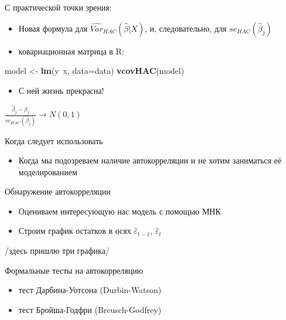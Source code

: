 \documentclass[ignorenonframetext,]{beamer}
\newenvironment{Shaded}{\begin{snugshade}}{\end{snugshade}}
\newcommand{\KeywordTok}[1]{\textcolor[rgb]{0.13,0.29,0.53}{\textbf{{#1}}}}
\newcommand{\DataTypeTok}[1]{\textcolor[rgb]{0.13,0.29,0.53}{{#1}}}
\newcommand{\StringTok}[1]{\textcolor[rgb]{0.31,0.60,0.02}{{#1}}}
\newcommand{\NormalTok}[1]{{#1}}
\begin{document}
\begin{frame}[fragile]{С практической точки зрения:}

\begin{itemize}
\item
  Новая формула для $\widehat{Var}_{HAC}(\hat{\beta}|X)$, и,
  следовательно, для $se_{HAC}(\hat{\beta}_j)$
\item
  ковариационная матрица в R:
\end{itemize}

\begin{Shaded}
\begin{Highlighting}[]
\NormalTok{model <-}\StringTok{ }\KeywordTok{lm}\NormalTok{(y~x, }\DataTypeTok{data=}\NormalTok{data)}
\KeywordTok{vcovHAC}\NormalTok{(model)}
\end{Highlighting}
\end{Shaded}

\begin{itemize}
\itemsep1pt\parskip0pt
\item
  С ней жизнь прекрасна!
\end{itemize}

$\frac{\hat{\beta}_j-\beta_j}{se_{HAC}(\hat{\beta}_j)} \to N(0,1)$

\end{frame}

\begin{frame}{Когда следует использовать}

\begin{itemize}
\itemsep1pt\parskip0pt
\item
  Когда мы подозреваем наличие автокорреляции и не хотим заниматься её
  моделированием
\end{itemize}

\end{frame}

\begin{frame}{Обнаружение автокорреляции}

\begin{itemize}
\item
  Оцениваем интересующую нас модель с помощью МНК
\item
  Строим график остатков в осях $\hat{\varepsilon}_{t-1}$,
  $\hat{\varepsilon}_{t}$
\end{itemize}

/здесь пришлю три графика/

\end{frame}

\begin{frame}{Формальные тесты на автокорреляцию}

\begin{itemize}
\item
  тест Дарбина-Уотсона (Durbin-Watson)
\item
  тест Бройша-Годфри (Breusch-Godfrey)
\end{itemize}

\end{frame}
\end{document}
